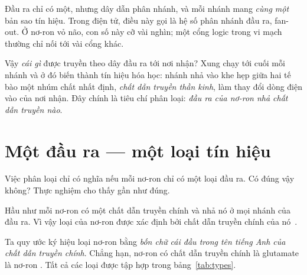 Đầu ra chỉ có một, nhưng dây dẫn phân nhánh, và mỗi nhánh mang \emph{cùng một} bản sao tín hiệu. Trong điện tử, điều này gọi là hệ số phân nhánh đầu ra, fan-out. Ở nơ-ron vỏ não, con số này cỡ vài nghìn; một cổng logic trong vi mạch thường chỉ nối tới vài cổng khác.

Vậy \emph{cái gì} được truyền theo dây đầu ra tới nơi nhận? Xung chạy tới cuối mỗi nhánh và ở đó biến thành tín hiệu hóa học: nhánh nhả vào khe hẹp giữa hai tế bào một nhúm chất nhất định, \emph{chất dẫn truyền thần kinh}, làm thay đổi dòng điện vào của nơi nhận. Đây chính là tiêu chí phân loại: \emph{đầu ra của nơ-ron nhả chất dẫn truyền nào}.

\section{Một đầu ra --- một loại tín hiệu}

Việc phân loại chỉ có nghĩa nếu mỗi nơ-ron chỉ có một loại đầu ra. Có đúng vậy không? Thực nghiệm cho thấy gần như đúng.

\begin{keyblock}
\begin{proposition}
\label{prop:dale}
Hầu như mỗi nơ-ron có một chất dẫn truyền chính và nhả nó ở mọi nhánh của đầu ra. Vì vậy loại của nơ-ron được xác định bởi chất dẫn truyền chính của nó~\cite{Strata1999}.
\end{proposition}
\end{keyblock}

Ta quy ước ký hiệu loại nơ-ron bằng \emph{bốn chữ cái đầu trong tên tiếng Anh của chất dẫn truyền chính}. Chẳng hạn, nơ-ron có chất dẫn truyền chính là glutamate là nơ-ron . Tất cả các loại được tập hợp trong bảng~\ref{tab:types}.

